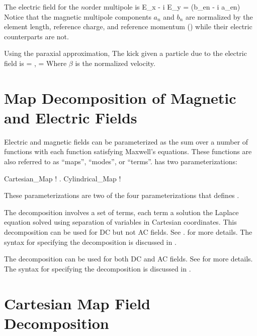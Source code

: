 The electric field for the $n$\Th order multipole is
\Begineq
  E_x - i E_y = (b_{en} - i a_{en}) \, 
\Endeq
Notice that the magnetic multipole components $a_n$ and $b_n$ are normalized by the
element length, reference charge, and reference momentum () while their electric
counterparts are not.

Using the paraxial approximation, The kick given a particle due to the electric field is
\Begineq
   = , \qquad {} = 
\Endeq
Where $\beta$ is the normalized velocity.

\section{Map Decomposition of Magnetic and Electric Fields}
\label{s:field.map}

Electric and magnetic fields can be parameterized as the sum over a number of functions
with each function satisfying Maxwell's equations. These functions are also referred to as
``maps'', ``modes'', or ``terms''. \bmad has two parameterizations:
\begin{example}
  Cartesian_Map      ! .
  Cylindrical_Map    ! 
\end{example}
These parameterizations are two of the four  parameterizations that \bmad
defines .

The  decomposition involves a set of terms, each term a solution the
Laplace equation solved using separation of variables in Cartesian coordinates. This
decomposition can be used for DC but not AC fields. See .
for more details. The syntax for specifying the  decomposition
is discussed in .

The  decomposition can be used for both DC and AC fields. See
 for more details. The syntax for specifying the
 decomposition is discussed in .

\section{Cartesian Map Field Decomposition}
\label{s:cart.map.phys}

